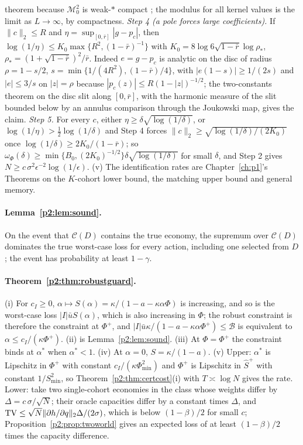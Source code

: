 theorem because $\mathcal M_0^2$ is weak-$*$ compact \citep{p2:donoho1994}; the modulus for all kernel values is the limit as $L\to\infty$, by compactness. \emph{Step 4 (a pole forces large coefficients).} If $\|c\|_2\le R$ and $\eta=\sup_{[0,\bar r]}|g-p_c|$, then $\log(1/\eta)\le K_0\max\{R^2,(1-\bar r)^{-1}\}$ with $K_0=8\log6\sqrt{1-\bar r}\log\rho_*$, $\rho_*=(1+\sqrt{1-\bar r})^2/\bar r$. Indeed $e=g-p_c$ is analytic on the disc of radius $\rho=1-s/2$, $s=\min\{1/(4R^2),(1-\bar r)/4\}$, with $|e(1-s)|\ge1/(2s)$ and $|e|\le3/s$ on $|z|=\rho$ because $|p_c(z)|\le R(1-|z|)^{-1/2}$; the two-constants theorem on the disc slit along $[0,\bar r]$, with the harmonic measure of the slit bounded below by an annulus comparison through the Joukowski map, gives the claim. \emph{Step 5.} For every $c$, either $\eta\ge\delta\sqrt{\log(1/\delta)}$, or $\log(1/\eta)>\tfrac12\log(1/\delta)$ and Step 4 forces $\|c\|_2\ge\sqrt{\log(1/\delta)/(2K_0)}$ once $\log(1/\delta)\ge2K_0/(1-\bar r)$; so $\omega_\Phi(\delta)\ge\min\{B_0,(2K_0)^{-1/2}\}\delta\sqrt{\log(1/\delta)}$ for small $\delta$, and Step 2 gives $N\ge c\,\sigma^2\epsilon^{-2}\log(1/\epsilon)$. (v) The identification rates are Chapter~\ref{ch:p1}'s Theorems on the $K$-cohort lower bound, the matching upper bound and general memory.

\paragraph{Lemma~\ref{p2:lem:sound}.} On the event that $\mathcal C(D)$ contains the true economy, the supremum over $\mathcal C(D)$ dominates the true worst-case loss for every action, including one selected from $D$; the event has probability at least $1-\gamma$.

\paragraph{Theorem~\ref{p2:thm:robustguard}.} (i) For $c_I\ge0$, $\alpha\mapsto S(\alpha)=\kappa/(1-a-\kappa\alpha\Phi)$ is increasing, and so is the worst-case loss $|I|\bar uS(\alpha)$, which is also increasing in $\Phi$; the robust constraint is therefore the constraint at $\Phi^+$, and $|I|\bar u\kappa/(1-a-\kappa\alpha\Phi^+)\le\mathcal B$ is equivalent to $\alpha\le c_I/(\kappa\Phi^+)$. (ii) is Lemma~\ref{p2:lem:sound}. (iii) At $\Phi=\Phi^+$ the constraint binds at $\alpha^*$ when $\alpha^*<1$. (iv) At $\alpha=0$, $S=\kappa/(1-a)$. (v) Upper: $\alpha^*$ is Lipschitz in $\Phi^+$ with constant $c_I/(\kappa\Phi_{\min}^2)$ and $\Phi^+$ is Lipschitz in $\hat S^+$ with constant $1/S_{\min}^2$, so Theorem~\ref{p2:thm:certcost}(i) with $T\asymp\log N$ gives the rate. Lower: take two single-cohort economies in the class whose weights differ by $\Delta=c\,\sigma/\sqrt N$; their oracle capacities differ by a constant times $\Delta$, and ${\rm TV}\le\sqrt N\|\partial h/\partial q\|_2\Delta/(2\sigma)$, which is below $(1-\beta)/2$ for small $c$; Proposition~\ref{p2:prop:twoworld} gives an expected loss of at least $(1-\beta)/2$ times the capacity difference.

